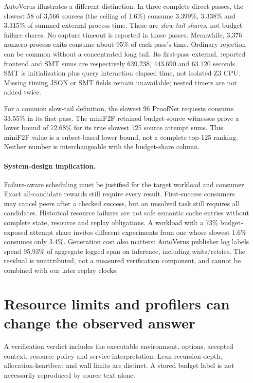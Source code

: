 \documentclass[10pt,twocolumn]{article}
\begin{document}
AutoVerus illustrates a different distinction. In three complete direct
passes, the slowest 58 of 3,566 sources (the ceiling of 1.6\%) consume
3.399\%, 3.338\% and 3.315\% of summed external process time.
These are \emph{slow-tail shares}, not budget-failure shares.
No capture timeout is reported in those passes.
Meanwhile, 3,376 nonzero process exits consume about 95\% of each pass's
time. Ordinary rejection can be common without a concentrated long tail.
Its first-pass external, reported frontend and SMT sums are respectively
639.238, 443.690 and 63.120 seconds. SMT is initialization plus query
interaction elapsed time, not isolated Z3 CPU. Missing timing JSON or SMT
fields remain unavailable; nested timers are not added twice.

For a common slow-tail definition, the slowest 96 ProofNet requests consume
33.55\% in its first pass. The miniF2F retained budget-source witnesses prove
a lower bound of 72.68\% for its true slowest 125 source attempt sums.
This miniF2F value is a subset-based lower bound, not a complete top-125
ranking. Neither number is interchangeable with the budget-share column.

\paragraph{System-design implication.}
Failure-aware scheduling must be justified for the target workload and
consumer. Exact all-candidate rewards still require every result.
First-success consumers may cancel peers after a checked success, but an
unsolved task still requires all candidates. Historical resource failures
are not safe semantic cache entries without complete state, resource and
replay obligations.
A workload with a 73\% budget-exposed attempt share invites different
experiments from one whose slowest 1.6\% consumes only 3.4\%.
Generation cost also matters: AutoVerus publisher log labels spend
95.93\% of aggregate logged span on inference, including waits/retries.
The residual is unattributed, not a measured verification component, and
cannot be combined with our later replay clocks.

\section{Resource limits and profilers can change the observed answer}
\label{sec:reproducibility}
A verification verdict includes the executable environment, options,
accepted context, resource policy and service interpretation.
Lean recursion-depth, allocation-heartbeat and wall limits are distinct.
A stored budget label is not necessarily reproduced by source text alone.
\end{document}
